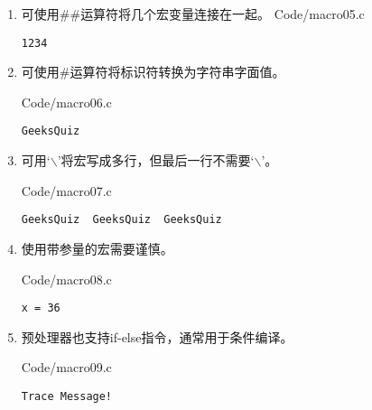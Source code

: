 \documentclass[10pt,a4paper%
tablecaptionabove]{article}
\def\tf{\ttfamily}
\begin{document}
\begin{CJK}{UTF8}{gkai}
\begin{enumerate}
\item 可使用{\tf \#\#}运算符将几个宏变量连接在一起。
{Code/macro05.c}
\begin{lstlisting}[backgroundcolor=\color{red!10}]
1234
\end{lstlisting}

\item 可使用{\tf \#}运算符将标识符转换为字符串字面值。

{Code/macro06.c}
\begin{lstlisting}[backgroundcolor=\color{red!10}]
GeeksQuiz
\end{lstlisting}

\item 可用‘{$\backslash$}’将宏写成多行，但最后一行不需要‘{$\backslash$}’。

{Code/macro07.c}
\begin{lstlisting}[backgroundcolor=\color{red!10}]
GeeksQuiz  GeeksQuiz  GeeksQuiz
\end{lstlisting}
%
\item 使用带参量的宏需要谨慎。

{Code/macro08.c}
\begin{lstlisting}[backgroundcolor=\color{red!10}]
x = 36
\end{lstlisting}
\item 预处理器也支持if-else指令，通常用于条件编译。

{Code/macro09.c}
\begin{lstlisting}[backgroundcolor=\color{red!10}]
Trace Message!

\end{lstlisting}
\end{enumerate}
\end{CJK}
\end{document}
